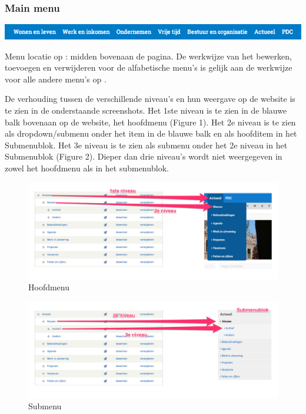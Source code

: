 \bigskip

\subsubsection{Main menu}\label{mainmenu}

\begin{center}
	\includegraphics[width=\textwidth]{img/menu_main.png}
\end{center}

Menu locatie op \drupalpath{}: midden bovenaan de pagina. De werkwijze van het bewerken, toevoegen en verwijderen voor de alfabetische menu's is gelijk aan de werkwijze voor alle andere menu's op \drupalpath{}. 

De verhouding tussen de verschillende niveau's en hun weergave op de website is te zien in de onderstaande screenshots. Het 1ste niveau is te zien in de blauwe balk bovenaan op de website, het hoofdmenu (Figure 1). Het 2e niveau is te zien als dropdown/submenu onder het item in de blauwe balk en als hoofditem in het Submenublok. Het 3e niveau is te zien als submenu onder het 2e niveau in het Submenublok (Figure 2). Dieper dan drie niveau's wordt niet weergegeven in zowel het hoofdmenu als in het submenublok.

\begin{figure}[h!]
  \includegraphics[width=\textwidth]{img/menu_mainmenu.png}
  \caption{Hoofdmenu}
\end{figure}

\begin{figure}[h!]
  \includegraphics[width=\textwidth]{img/menu_submenu.png}
  \caption{Submenu}
\end{figure}

